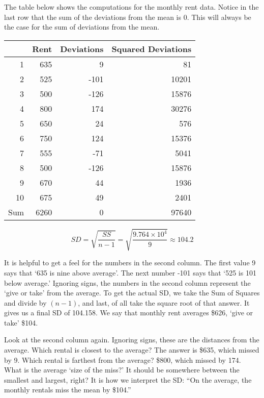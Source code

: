 \documentclass[11pt]{book}\usepackage[]{graphicx}\usepackage[]{color}
\begin{document}
The table below shows the computations for the monthly rent data. Notice in the last row that the sum of the deviations from the mean is 0. This will always be the case for the sum of deviations from the mean.


\begin{table}[ht]
\centering
\begin{tabular}{rrrr}
  \hline
 & Rent & Deviations & Squared Deviations \\ 
  \hline
1 & 635 & 9 & 81 \\ 
  2 & 525 & -101 & 10201 \\ 
  3 & 500 & -126 & 15876 \\ 
  4 & 800 & 174 & 30276 \\ 
  5 & 650 & 24 & 576 \\ 
  6 & 750 & 124 & 15376 \\ 
  7 & 555 & -71 & 5041 \\ 
  8 & 500 & -126 & 15876 \\ 
  9 & 670 & 44 & 1936 \\ 
  10 & 675 & 49 & 2401 \\ 
  Sum & 6260 & 0 & 97640 \\ 
   \hline
\end{tabular}
\end{table}


$$ SD = \sqrt{ \frac{ SS}{n - 1}} = \sqrt{ \frac{ \ensuremath{9.764\times 10^{4}}}{9}} \approx 104.2 $$

It is helpful to get a feel for the numbers in the second column.  The first value 9 says that `635 is nine above average'.  The next number -101 says that `525 is 101 below average.'  Ignoring signs, the numbers in the second column represent the `give or take' from the average.  To get the actual SD, we take the Sum of Squares and divide by $(n - 1)$, and last, of all take the square root of that answer.  It gives us a final SD of 104.158.  We say that monthly rent averages \$626, `give or take' \$104.

Look at the second column again.  Ignoring signs, these are the distances from the average.  Which rental is closest to the average? The answer is \$635, which missed by 9. Which rental is farthest from the average?  \$800, which missed by 174.
What is the average `size of the miss?'  It should be somewhere between the smallest and largest, right?  It is how we interpret the SD: ``On the average, the monthly rentals miss the mean by \$104.''
\end{document}
